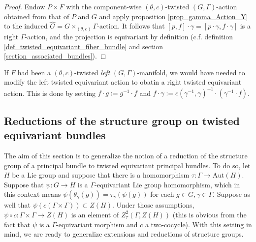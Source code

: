 \begin{proof}
    Endow \(P \times F\) with the component-wise \((\theta,c)\)-twisted \((G, \Gamma)\)-action obtained from that of \(P\) and \(G\) and apply proposition \ref{prop_gamma_Action_Y} to the induced \(\hat{G}=G\times_{(\theta,c)}\Gamma\)-action. It follows that \([p,f]\cdot \gamma=[p\cdot \gamma, f\cdot \gamma]\) is a right \(\Gamma\)-action, and the projection is equivariant by definition (c.f. definition \ref{def_twisted_equivariant_fiber_bundle} and section \ref{section_associated_bundles}).
\end{proof}

\begin{obs}
    If \(F\) had been a \((\theta,c)\)-twisted \textit{left} \((G, \Gamma)\)-manifold, we would have needed to modify the left twisted equivariant action to obatin a right twisted equivariant action. This is done by setting \(f\cdot g:=g^{-1}\cdot f\) and \(f\cdot \gamma:=c(\gamma^{-1}, \gamma)^{-1}\cdot (\gamma^{-1}\cdot f)\).
\end{obs}

\subsection{Reductions of the structure group on twisted equivariant bundles}
The aim of this section is to generalize the notion of a reduction of the structure group of a principal bundle to twisted equivariant principal bundles. To do so, let \(H\) be a Lie group and suppose that there is a homomorphism \(\tau\colon \Gamma \to \mathrm{Aut}(H)\). Suppose that \(\psi\colon G \to H\) is a \(\Gamma\)-equivariant Lie group homomorphism, which in this context means \(\psi(\theta_\gamma(g))=\tau_\gamma(\psi(g))\) for each \(g \in G, \gamma \in \Gamma\). Suppose as well that \(\psi(c(\Gamma \times \Gamma))\subset Z(H)\). Under those assumptions, \(\psi \circ c\colon \Gamma \times \Gamma \to Z(H)\) is an element of \(Z_\tau^2(\Gamma, Z(H))\) (this is obvious from the fact that \(\psi\) is a \(\Gamma\)-equivariant morphism and \(c\) a two-cocycle). With this setting in mind, we are ready to generalize extensions and reductions of structure groups.

